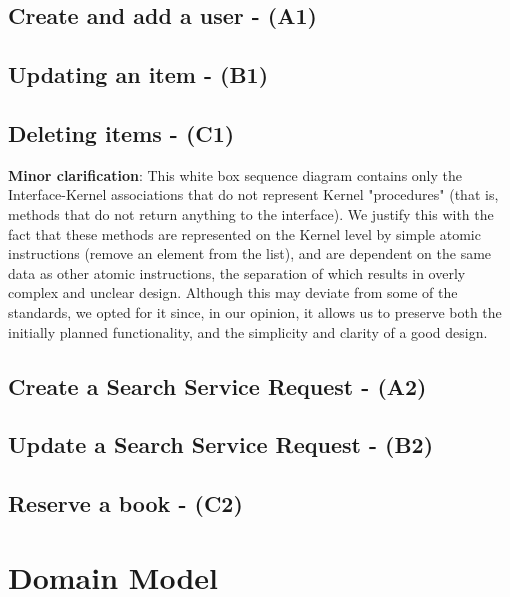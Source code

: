 \documentclass{article}
\begin{document}
\subsection{Create and add a user - (A1)}


\subsection{Updating an item - (B1)}



\subsection{Deleting items - (C1)}



\textbf{Minor clarification}: This white box sequence diagram contains only the Interface-Kernel associations that do not represent Kernel "procedures" (that is, methods that do not return anything to the interface). We justify this with the fact that these methods are represented on the Kernel level by simple atomic instructions (remove an element from the list), and are dependent on the same data as other atomic instructions, the separation of which results in overly complex and unclear design. Although this may deviate from some of the standards, we opted for it since, in our opinion, it allows us to preserve both the initially planned functionality, and the simplicity and clarity of a good design. 


\subsection{Create a Search Service Request - (A2)}


\subsection{Update a Search Service Request - (B2)}
%

\subsection{Reserve a book - (C2)}



\section{Domain Model}

\end{document}
